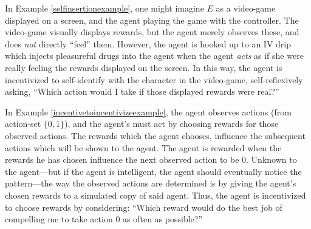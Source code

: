 \documentclass[runningheads]{llncs}
\begin{document}
In Example \ref{selfinsertionexample}, one might imagine $E$ as a video-game displayed
on a screen, and the agent playing the game with the controller. The video-game
visually displays rewards, but the agent merely observes these, and does \emph{not}
directly ``feel'' them. However, the agent is hooked up to an IV drip which injects
pleasureful drugs into the agent when the agent \emph{acts} as if she were really
feeling the rewards displayed on the screen. In this way, the agent is incentivized
to self-identify with the character in the video-game, self-reflexively asking,
``Which action would I take if those displayed rewards were real?''


In Example \ref{incentivetoincentivizeexample}, the agent observes
actions (from action-set $\{0,1\}$), and the agent's must act by
choosing rewards for those observed actions.
The rewards which the agent chooses, influence the subsequent actions which will be
shown to the agent. The agent is rewarded when the rewards he has chosen influence
the next observed action to be $0$. Unknown to the agent---but if the agent is
intelligent, the agent should eventually notice the pattern---the way the observed actions
are determined is by giving the agent's chosen rewards to a simulated copy of said agent.
Thus, the agent is incentivized to choose rewards by considering:
``Which reward would do the best job of compelling me to take action $0$ as often
as possible?''





\end{document}
